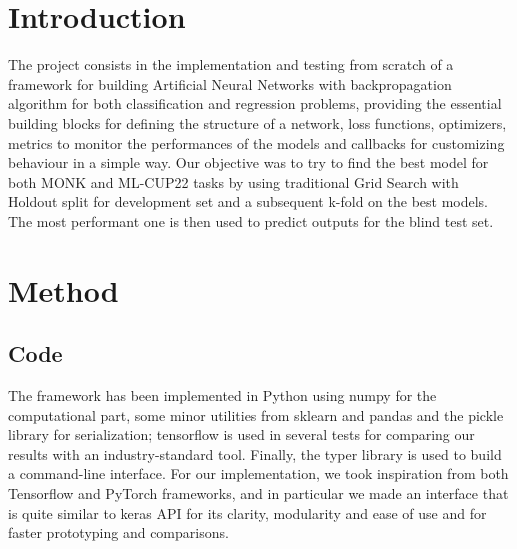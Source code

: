 \section{Introduction}
The project consists in the implementation and testing from scratch of a framework for building Artificial Neural Networks with backpropagation
algorithm for both classification and regression problems, providing the essential building blocks for defining the structure of a network, loss
functions, optimizers, metrics to monitor the performances of the models and callbacks for customizing behaviour in a simple way. Our objective
was to try to find the best model for both MONK and ML-CUP22 tasks by using traditional Grid Search with Holdout split for development set and
a subsequent k-fold on the best models. The most performant one is then used to predict outputs for the blind test set. 

\section{Method}

\subsection{Code}

The framework has been implemented in Python using numpy for the computational part, some minor utilities from sklearn and pandas and the
pickle library for serialization; tensorflow is used in several tests for comparing our results with an industry-standard tool.
Finally, the typer library is used to build a command-line interface.
For our implementation, we took inspiration from both Tensorflow and PyTorch frameworks, and in particular we made an interface
that is quite similar to keras API for its clarity, modularity and ease of use and for faster prototyping and comparisons.

\paragraph{}


